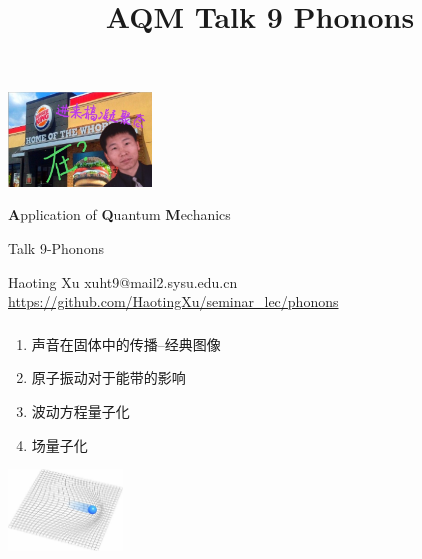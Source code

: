 \documentclass[CJK]{beamer}
\title{AQM Talk 9 Phonons}
\author{}
\date{}
\begin{document}
\begin{frame}
 
\begin{center}
\begin{Large}
  \bch
  \begin{center}
\includegraphics[width = 1.5in]{whopper}
\end{center}

{\bf A}pplication of {\bf Q}uantum {\bf M}echanics

{\vskip 0.1in}

Talk 9-Phonons

\ech
\end{Large}
\end{center}


\vskip 0.1in
\begin{center}
Haoting Xu
\vskip 0.1in
xuht9@mail2.sysu.edu.cn
\vskip 0.1in
{\tiny \url{https://github.com/HaotingXu/seminar_lec/phonons} }\\
\end{center}


\end{frame}
\begin{frame}\frametitle{\ech}
  \bch
  \begin{enumerate}
  \item 声音在固体中的传播--经典图像
  \item 原子振动对于能带的影响
  \item 波动方程量子化
  \item 场量子化
    \end{enumerate}
  \begin{center}
    \includegraphics[width = 1.2in]{phonon}
  \end{center}
  \ech
\end{frame}
\end{document}

